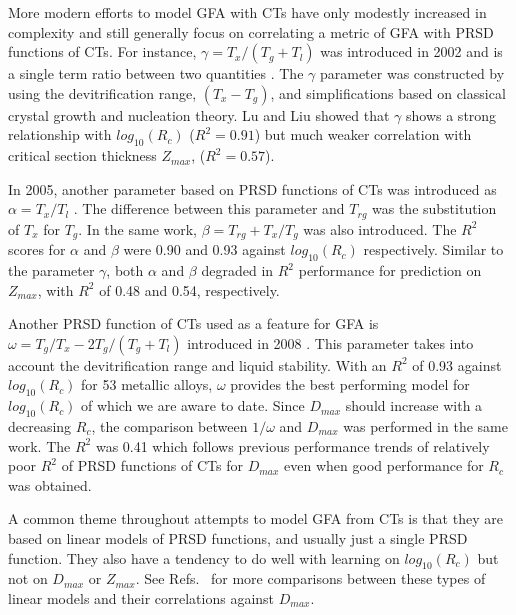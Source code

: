 \documentclass[11pt,a4paper]{article}
\begin{document}
\par
More modern efforts to model GFA with CTs have only modestly increased in complexity and still generally focus on correlating a metric of GFA with PRSD functions of CTs. For instance, $\gamma=T_{x}/(T_{g}+T_{l})$ was introduced in 2002 and is a single term ratio between two quantities \cite{Lu2002}. The $\gamma$ parameter was constructed by using the devitrification range, $(T_{x}-T_{g})$, and simplifications based on classical crystal growth and nucleation theory. Lu and Liu \cite{Lu2002} showed that $\gamma$ shows a strong relationship with $log_{10}(R_{c})$ ($R^{2}=0.91$) but much weaker correlation with critical section thickness $Z_{max}$, ($R^{2}=0.57$).

\par
In 2005, another parameter based on PRSD functions of CTs was introduced as $\alpha=T_{x}/T_{l}$ \cite{Mondal2005}. The difference between this parameter and $T_{rg}$ was the substitution of $T_{x}$ for $T_{g}$. In the same work, $\beta=T_{rg}+T_{x}/T_{g}$ was also introduced. The $R^{2}$ scores for $\alpha$ and $\beta$ were 0.90 and 0.93 against $log_{10}(R_{c})$ respectively. Similar to the parameter $\gamma$, both $\alpha$ and $\beta$ degraded in $R^{2}$ performance for prediction on $Z_{max}$, with $R^{2}$ of 0.48 and 0.54, respectively.

\par
Another PRSD function of CTs used as a feature for GFA is $\omega=T_{g}/T_{x}-2T_{g}/(T_{g}+T_{l})$ introduced in 2008 \cite{Long2009}. This parameter takes into account the devitrification range and liquid stability. With an $R^{2}$ of 0.93 against $log_{10}(R_{c})$ for 53 metallic alloys, $\omega$ provides the best performing model for $log_{10}(R_{c})$ of which we are aware to date. Since $D_{max}$ should increase with a decreasing $R_{c}$, the comparison between $1/\omega$ and $D_{max}$ was performed in the same work. The $R^{2}$ was 0.41 which follows previous performance trends of relatively poor $R^{2}$ of PRSD functions of CTs for $D_{max}$ even when good performance for $R_{c}$ was obtained.

\par
A common theme throughout attempts to model GFA from CTs is that they are based on linear models of PRSD functions, and usually just a single PRSD function. They also have a tendency to do well with learning on $log_{10}(R_{c})$ but not on $D_{max}$ or $Z_{max}$. See Refs.~\cite{Deng2020, Xiong2019} for more comparisons between these types of linear models and their correlations against $D_{max}$.
\end{document}
